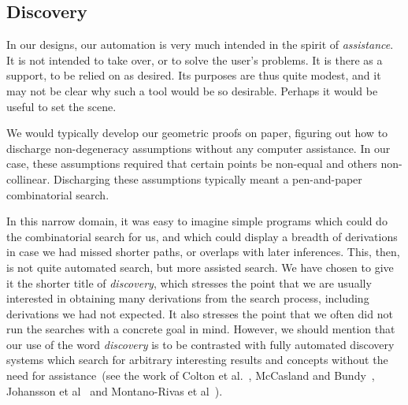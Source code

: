 


\subsection{Discovery}
In our designs, our automation is very much intended in the spirit of \emph{assistance}. It is not intended to take over, or to solve the user's problems. It is there as a support, to be relied on as desired. Its purposes are thus quite modest, and it may not be clear why such a tool would be so desirable. Perhaps it would be useful to set the scene.

We would typically develop our geometric proofs on paper, figuring out how to discharge non-degeneracy assumptions without any computer assistance. In our case, these assumptions required that certain points be non-equal and others non-collinear. Discharging these assumptions typically meant a pen-and-paper combinatorial search.

In this narrow domain, it was easy to imagine simple programs which could do the combinatorial search for us, and which could display a breadth of derivations in case we had missed shorter paths, or overlaps with later inferences. This, then, is not quite automated search, but more assisted search. We have chosen to give it the shorter title of \emph{discovery}, which stresses the point that we are usually interested in obtaining many derivations from the search process, including derivations we had not expected. It also stresses the point that we often did not run the searches with a concrete goal in mind. However, we should mention that our use of the word \emph{discovery} is to be contrasted with fully automated discovery systems which search for arbitrary interesting results and concepts without the need for assistance~(see the work of Colton et al.~\cite{ColtonInterestingness,MathematicalDiscovery}, McCasland and Bundy~\cite{Mathsaid}, Johansson et al~\cite{ConjectureSynthesis} and Montano-Rivas et al~\cite{SchemeBasedSynthesis,SchemeBasedConceptInvention}).

